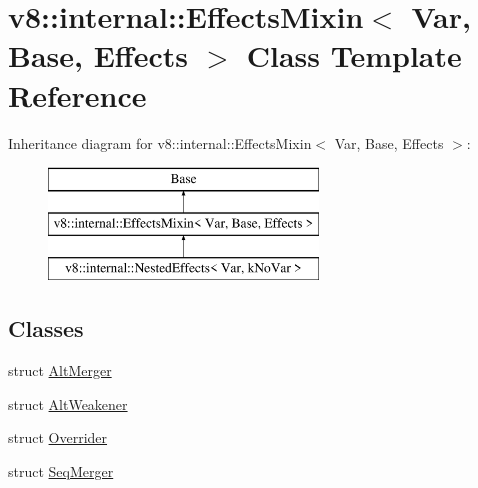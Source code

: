 \hypertarget{classv8_1_1internal_1_1_effects_mixin}{}\section{v8\+:\+:internal\+:\+:Effects\+Mixin$<$ Var, Base, Effects $>$ Class Template Reference}
\label{classv8_1_1internal_1_1_effects_mixin}
Inheritance diagram for v8\+:\+:internal\+:\+:Effects\+Mixin$<$ Var, Base, Effects $>$\+:\begin{figure}[H]
\begin{center}
\leavevmode
\includegraphics[height=3.000000cm]{classv8_1_1internal_1_1_effects_mixin}
\end{center}
\end{figure}
\subsection*{Classes}
\begin{DoxyCompactItemize}
\item 
struct \hyperlink{structv8_1_1internal_1_1_effects_mixin_1_1_alt_merger}{Alt\+Merger}
\item 
struct \hyperlink{structv8_1_1internal_1_1_effects_mixin_1_1_alt_weakener}{Alt\+Weakener}
\item 
struct \hyperlink{structv8_1_1internal_1_1_effects_mixin_1_1_overrider}{Overrider}
\item 
struct \hyperlink{structv8_1_1internal_1_1_effects_mixin_1_1_seq_merger}{Seq\+Merger}
\end{DoxyCompactItemize}

